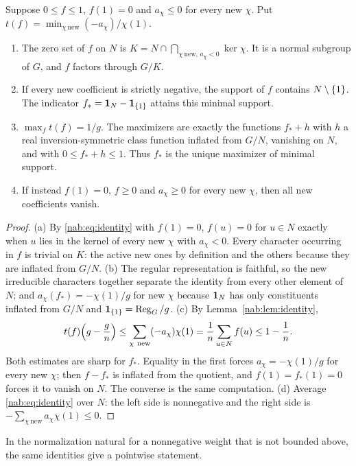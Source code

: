 \begin{theorem}\label{nab:thm:minimax}
Suppose $0\le f\le1$, $f(1)=0$ and $a_\chi\le0$ for every new $\chi$. Put
$t(f)=\min_{\chi\ \mathrm{new}}(-a_\chi)/\chi(1)$.
\begin{enumerate}[label=\textup{(\alph*)}]
\item The zero set of $f$ on $N$ is $K=N\cap\bigcap_{\chi\ \mathrm{new},\,a_\chi<0}\ker\chi$.
It is a normal subgroup of $G$, and $f$ factors through $G/K$.
\item If every new coefficient is strictly negative, the support of $f$ contains
$N\setminus\{1\}$. The indicator $f_*=\mathbf{1}_N-\mathbf{1}_{\{1\}}$ attains this minimal
support.
\item $\max_ft(f)=1/g$. The maximizers are exactly the functions $f_*+h$ with $h$ a real
inversion-symmetric class function inflated from $G/N$, vanishing on $N$, and with
$0\le f_*+h\le1$. Thus $f_*$ is the unique maximizer of minimal support.
\item If instead $f(1)=0$, $f\ge0$ and $a_\chi\ge0$ for every new $\chi$, then all new
coefficients vanish.
\end{enumerate}
\end{theorem}
\begin{proof}
(a) By \eqref{nab:eq:identity} with $f(1)=0$, $f(u)=0$ for $u\in N$ exactly when $u$ lies
in the kernel of every new $\chi$ with $a_\chi<0$. Every character occurring in $f$ is
trivial on $K$: the active new ones by definition and the others because they are inflated
from $G/N$. (b) The regular representation is faithful, so the new irreducible characters
together separate the identity from every other element of $N$; and
$a_\chi(f_*)=-\chi(1)/g$ for new $\chi$ because $\mathbf{1}_N$ has only constituents inflated
from $G/N$ and $\mathbf{1}_{\{1\}}=\operatorname{Reg}_G/g$. (c) By Lemma~\ref{nab:lem:identity},
\[
 t(f)\Bigl(g-\frac gn\Bigr)\le\sum_{\chi\ \mathrm{new}}(-a_\chi)\chi(1)
 =\frac1n\sum_{u\in N}f(u)\le1-\frac1n .
\]
Both estimates are sharp for $f_*$. Equality in the first forces $a_\chi=-\chi(1)/g$ for
every new $\chi$; then $f-f_*$ is inflated from the quotient, and $f(1)=f_*(1)=0$ forces it
to vanish on $N$. The converse is the same computation. (d) Average
\eqref{nab:eq:identity} over $N$: the left side is nonnegative and the right side is
$-\sum_{\chi\ \mathrm{new}}a_\chi\chi(1)\le0$.
\end{proof}

In the normalization natural for a nonnegative weight that is not bounded above, the same
identities give a pointwise statement.

